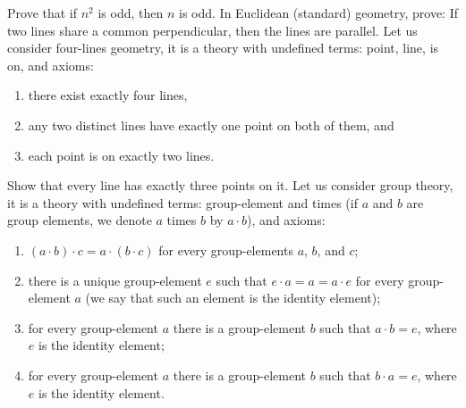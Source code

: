 \begin{chapterendexercises}
    \exercise[recommended] Prove that if $n^2$ is odd, then $n$ is odd.
    \exercise  In Euclidean (standard) geometry, prove: If two lines share a
        common perpendicular, then the lines are parallel.
    \exercise[recommended] Let us consider four-lines geometry, it is a theory with
        undefined terms: point, line, is on, and axioms:
        \begin{enumerate}
            \item there exist exactly four lines,
            \item any two distinct lines have exactly one point on both of them, and
            \item each point is on exactly two lines.
        \end{enumerate}

        Show that every line has exactly three points on it.
    \exercise Let us consider group theory, it is a theory with undefined
        terms: group-element and times (if $a$ and $b$ are group elements,
        we denote $a$ times $b$ by $a \cdot b$), and axioms:
        \begin{enumerate}
          \item $(a \cdot b) \cdot c = a \cdot (b \cdot c)$
            for every group-elements $a$, $b$, and $c$;
          \item there is a unique group-element $e$ such that
            $e \cdot a = a = a \cdot e$ for every group-element $a$
            (we say that such an element is the identity element);
          \item for every group-element $a$ there is a group-element $b$
            such that $a \cdot b = e$, where $e$ is the identity element;
          \item for every group-element $a$ there is a group-element $b$
            such that $b \cdot a = e$, where $e$ is the identity element.
        \end{enumerate}


\end{chapterendexercises}
